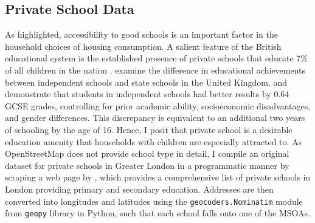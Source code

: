 \documentclass{article}
\begin{document}
\subsection{Private School Data} \label{subsection:school}
As \citet{Niu2016ModelingDemand} highlighted, accessibility to good schools is an important factor in the household choices of housing consumption. A salient feature of the British educational system is the established presence of private schools that educate 7\% of all children in the nation \citep{Green2019WhatProblem}. \citet{Ndaji2016ACouncil} examine the difference in educational achievements between independent schools and state schools in the United Kingdom, and demonstrate that students in independent schools had better results by 0.64 GCSE grades, controlling for prior academic ability, socioeconomic disadvantages, and gender differences. This discrepancy is equivalent to an additional two years of schooling by the age of 16. Hence, I posit that private school is a desirable education amenity that households with children are especially attracted to. As OpenStreetMap does not provide school type in detail, I compile an original dataset for private schools in Greater London in a programmatic manner by scraping a web page by \citet{IndependentSchoolsCouncil2019IndepnendentArea}, which provides a comprehensive list of private schools in London providing primary and secondary education. Addresses are then converted into longitudes and latitudes using the \texttt{geocoders.Nominatim} module from \texttt{geopy} library in Python, such that each school falls onto one of the MSOAs.
\end{document}
